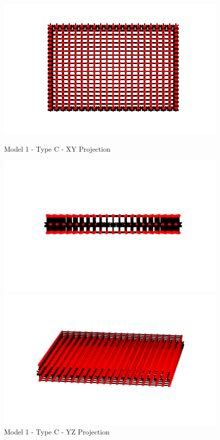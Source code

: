 \begin{figure}[!htbp]
\begin{minipage}{0.3\textwidth}
    \centering
    \includegraphics[width = 1\textwidth]{Figures/M1_type_c_XY.png}
    \caption{Model 1 - Type C - XY Projection}
    \label{fig:M1_c_XY}
\end{minipage}
\hspace{5mm}
\begin{minipage}{0.3\textwidth}
    \centering
    \includegraphics[width = 1\textwidth]{Figures/M1_type_c_YZ.png}
    \caption{Model 1 - Type C - YZ Projection}
    \label{fig:M1_c_YZ}
\end{minipage}
\hspace{5mm}
\begin{minipage}{0.3\textwidth}
    \centering
    \includegraphics[width = 1\textwidth]{Figures/M1_type_c_3D.png}

\end{minipage}
\end{figure}
